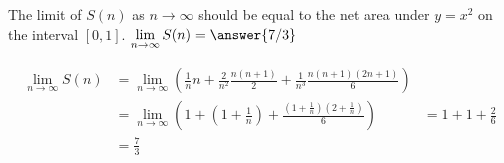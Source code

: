 \documentclass{ximera}
\begin{document}
\begin{question}
		The limit of $S(n)$ as $n \to \infty$ should be equal to the net area under $y=x^2$ on the interval $[0,1]$.  $\lim_{n \to \infty} S(n) = \answer{7/3}$
			\begin{hint}
				\begin{align*}
					\lim_{n \to \infty} S(n) &= \lim_{n \to \infty} \left( \frac{1}{n} n + \frac{2}{n^2} \frac{n(n+1)}{2} + \frac{1}{n^3} \frac{n(n+1)(2n+1)}{6} \right)\\
					&= \lim_{n \to \infty} \left( 1 + (1+\frac{1}{n})+ \frac{(1+\frac{1}{n})(2+\frac{1}{n})}{6}\right)
					&=1+1+\frac{2}{6}\\
					&=\frac{7}{3}					 
				\end{align*}
			\end{hint}
	\end{question}
	
	
\end{document}
